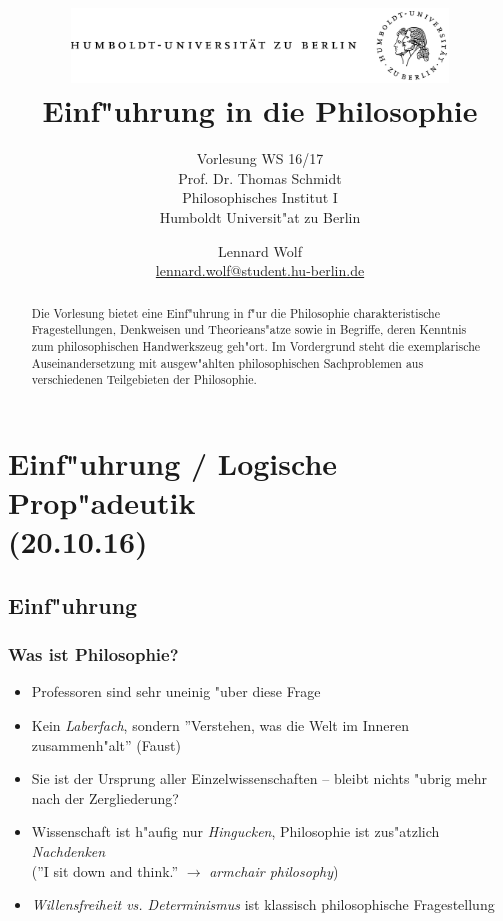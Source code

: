 \documentclass[]{scrartcl}
\begin{document}
\title{
	\includegraphics*[width=0.75\textwidth]{images/hu_logo.png}\\
	\vspace{24pt}
	Einf"uhrung in die Philosophie}
\subtitle{Vorlesung WS 16/17\\
          Prof. Dr. Thomas Schmidt\\
          Philosophisches Institut I \\ 
          Humboldt Universit"at zu Berlin}
\author{Lennard Wolf\\
        \href{mailto:lennard.wolf@student.hu-berlin.de}{lennard.wolf@student.hu-berlin.de}}
\maketitle
\begin{abstract}

Die Vorlesung bietet eine Einf"uhrung in f"ur die Philosophie charakteristische Fragestellungen, Denkweisen und Theorieans"atze sowie in Begriffe, deren Kenntnis zum philosophischen Handwerkszeug geh"ort. Im Vordergrund steht die exemplarische Auseinandersetzung mit ausgew"ahlten philosophischen Sachproblemen aus verschiedenen Teilgebieten der Philosophie.

\end{abstract}
\newpage

\tableofcontents
\listoffigures
\newpage


\section{Einf"uhrung / Logische Prop"adeutik\\(20.10.16)}

\subsection{Einf"uhrung}
\subsubsection{Was ist Philosophie?}

\begin{itemize}
  \item Professoren sind sehr uneinig "uber diese Frage
  \item Kein \emph{Laberfach}, sondern ''Verstehen, was die Welt im Inneren zusammenh"alt'' (Faust)
  \item Sie ist der Ursprung aller Einzelwissenschaften -- bleibt nichts "ubrig mehr nach der Zergliederung?
  \item Wissenschaft ist h"aufig nur \emph{Hingucken}, Philosophie ist zus"atzlich \emph{Nachdenken}\\(''I sit down and think.'' $\rightarrow$ \emph{armchair philosophy})
  \item \emph{Willensfreiheit vs. Determinismus} ist klassisch philosophische Fragestellung
\end{itemize}
\end{document}
